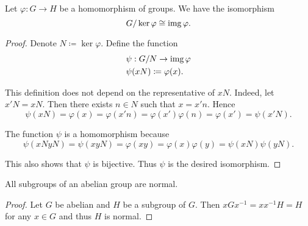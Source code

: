 \begin{theorem}\label{thm:homomorphism_theorem_for_groups}
  Let \( \varphi: G \to H \) be a homomorphism of groups. We have the isomorphism
  \begin{equation*}
    G / \ker \varphi \cong \operatorname{img} \varphi.
  \end{equation*}
\end{theorem}
\begin{proof}
  Denote \( N \coloneqq \ker \varphi \). Define the function
  \begin{align*}
    &\psi: G / N \to \operatorname{img} \varphi \\
    &\psi(xN) \coloneqq \varphi(x).
  \end{align*}

  This definition does not depend on the representative of \( xN \). Indeed, let \( x'N = xN \). Then there exists \( n \in N \) such that \( x = x' n \). Hence
  \begin{equation*}
    \psi(xN) = \varphi(x) = \varphi(x' n) = \varphi(x') \varphi(n) = \varphi(x') = \psi(x'N).
  \end{equation*}

  The function \( \psi \) is a homomorphism because
  \begin{equation*}
    \psi(xN yN) = \psi(xyN) = \varphi(xy) = \varphi(x) \varphi(y) = \psi(xN) \psi(yN).
  \end{equation*}

  This also shows that \( \psi \) is bijective. Thus \( \psi \) is the desired isomorphism.
\end{proof}

\begin{proposition}\label{thm:abelian_normal_subgroups}
  All subgroups of an abelian group are normal.
\end{proposition}
\begin{proof}
  Let \( G \) be abelian and \( H \) be a subgroup of \( G \). Then \( xGx^{-1} = xx^{-1}H = H \) for any \( x \in G \) and thus \( H \) is normal.
\end{proof}

